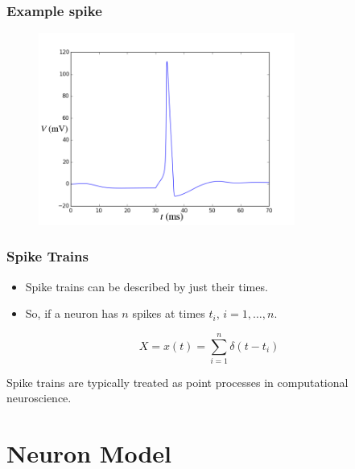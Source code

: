 \documentclass{beamer}
\begin{document}
\begin{frame}
\frametitle{Example spike}
\begin{center}
\begin{figure}
\includegraphics[width=0.75\textwidth]{hh.png}
\end{figure}
\end{center}
\end{frame}

\begin{frame}
\frametitle{Spike Trains}
\begin{itemize}
\item Spike trains can be described by just their times. \pause \\ \bigskip
\item So, if a neuron has $n$ spikes at times $t_i$, $i=1,\ldots,n$.\pause
\end{itemize}
\begin{equation*}
X = x(t) = \sum_{i=1}^{n} \delta \left( t - t_i \right)
\end{equation*}
\pause
\bigskip

Spike trains are typically treated as point processes in computational neuroscience.
\end{frame}

\section{Neuron Model}
\end{document}
